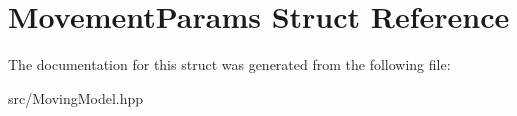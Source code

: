 \hypertarget{structMovementParams}{}\section{Movement\+Params Struct Reference}
\label{structMovementParams}


The documentation for this struct was generated from the following file\+:\begin{DoxyCompactItemize}
\item 
src/Moving\+Model.\+hpp\end{DoxyCompactItemize}
